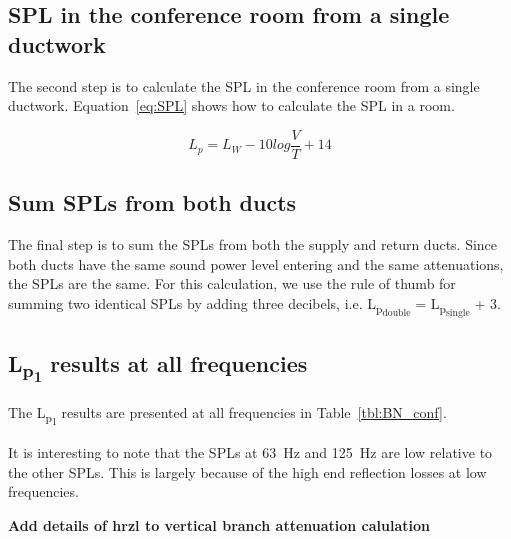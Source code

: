 \subsection{SPL in the conference room from a single ductwork}

The second step is to calculate the SPL in the conference room from a single ductwork.
Equation~\ref{eq:SPL} shows how to calculate the SPL in a room.

	\begin{equation}\label{eq:SPL}
		L_{p} = L_{W} - 10 log \frac{V}{T} + 14
	\end{equation}


\subsection{Sum SPLs from both ducts}

The final step is to sum the SPLs from both the supply and return ducts.
Since both ducts have the same sound power level entering and the same attenuations, the SPLs are the same.
For this calculation, we use the rule of thumb for summing two identical SPLs by adding three decibels, i.e. L\textsubscript{p\textsubscript{double}} = L\textsubscript{p\textsubscript{single}} + 3.


\subsection{L\textsubscript{p\textsubscript{1}} results at all frequencies}

The L\textsubscript{p\textsubscript{1}} results are presented at all frequencies in Table~\ref{tbl:BN_conf}.

It is interesting to note that the SPLs at 63~Hz and 125~Hz are low relative to the other SPLs.
This is largely because of the high end reflection losses at low frequencies.

\textbf{Add details of hrzl to vertical branch attenuation calulation}



